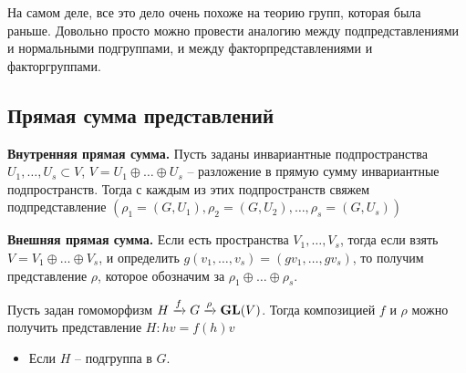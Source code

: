 \begin{comm}
	На самом деле, все это дело очень похоже на теорию групп, которая была раньше. Довольно просто можно провести аналогию между подпредставлениями и нормальными подгруппами, и между факторпредставлениями и факторгруппами.
\end{comm}

\subsection{Прямая сумма представлений}
{\bf Внутренняя прямая сумма.} Пусть заданы инвариантные подпространства $U_1, \ldots, U_s \subset V$, $V = U_1 \oplus \ldots \oplus U_s$ -- разложение в прямую сумму инвариантные подпространств. Тогда с каждым из этих подпространств свяжем подпредставление $(\rho_1 = (G, U_1), \rho_2 = (G, U_2), \ldots , \rho_s = (G, U_s))$ 

{\bf Внешняя прямая сумма.} Если есть пространства $V_1, \ldots, V_s$, тогда если взять $V = V_1 \oplus \ldots \oplus V_s$, и определить $g(v_1, \ldots, v_s) = (gv_1, \ldots, gv_s)$, то получим представление $\rho$, которое обозначим за $\rho_1 \oplus \ldots \oplus \rho_s$.

Пусть задан гомоморфизм $H \xrightarrow{f} G \xrightarrow{\rho} \mathbf{GL}(V)$. Тогда композицией $f$ и $\rho$ можно получить представление $H: hv = f(h)v$
	
\begin{itemize}
	\item Если $H$ -- подгруппа в $G$.
\end{itemize}
